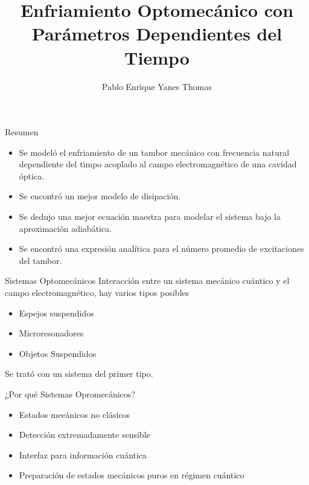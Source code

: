 \documentclass[10pt]{beamer}
\author{Pablo Enrique Yanes Thomas}
\title{Enfriamiento Optomecánico con Parámetros Dependientes del Tiempo}
\institute{IIMAS}
\begin{document}
\begin{frame}
\titlepage
\end{frame}


\begin{frame}{Resumen}

\begin{itemize}
\item Se modeló el enfriamiento de un tambor mecánico con frecuencia natural dependiente del timpo acoplado al campo electromagnético de una cavidad óptica.

\item Se encontró un mejor modelo de disipación.

\item Se dedujo una mejor ecuación maestra para modelar el sistema bajo la aproximación adiabática.

\item Se encontró una expresión analítica para el número promedio de excitaciones del tambor.
\end{itemize}

\end{frame}

\begin{frame}{Sistemas Optomecánicos}
Interacción entre un sistema mecánico cuántico y el campo electromagnético, hay varios tipos posibles

\begin{itemize}
\item Espejos suspendidos
\item Microresonadores
\item Objetos Suspendidos
\end{itemize}

Se trató con un sistema del primer tipo.

\end{frame}

\begin{frame}{¿Por qué Sistemas Opromecánicos?}

\begin{itemize}
\item Estados mecánicos no clásicos
\item Detección extremadamente sensible
\item Interfaz para información cuántica
\item Preparación de estados mecánicos puros en régimen cuántico 
\end{itemize}


\end{frame}
\end{document}
